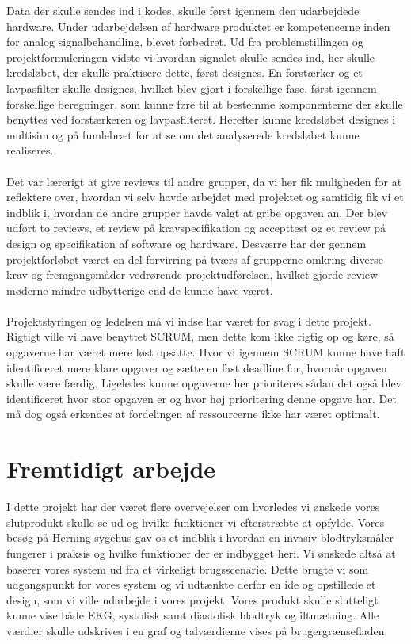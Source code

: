 Data der skulle sendes ind i kodes, skulle først igennem den udarbejdede hardware. Under udarbejdelsen af hardware produktet er kompetencerne inden for analog signalbehandling, blevet forbedret. Ud fra problemstillingen og projektformuleringen vidste vi hvordan signalet skulle sendes ind, her skulle kredsløbet, der skulle praktisere dette, først designes. En forstærker og et lavpasfilter skulle designes, hvilket blev gjort i forskellige fase, først igennem forskellige beregninger, som kunne føre til at bestemme komponenterne der skulle benyttes ved forstærkeren og lavpasfilteret. Herefter kunne kredsløbet designes i multisim og på fumlebræt for at se om det analyserede kredsløbet kunne realiseres. \\\\
Det var lærerigt at give reviews til andre grupper, da vi her fik muligheden for at reflektere over, hvordan vi selv havde arbejdet med projektet og samtidig fik vi et indblik i, hvordan de andre grupper havde valgt at gribe opgaven an. Der blev udført to reviews, et review på kravspecifikation og accepttest og et review på design og specifikation af software og hardware.  Desværre har der gennem projektforløbet været en del forvirring på tværs af grupperne omkring diverse krav og fremgangsmåder vedrørende projektudførelsen, hvilket gjorde review møderne mindre udbytterige end de kunne have været.\\\\
Projektstyringen og ledelsen må vi indse har været for svag i dette projekt. Rigtigt ville vi have benyttet SCRUM, men dette kom ikke rigtig op og køre, så opgaverne har været mere løst opsatte. Hvor vi igennem SCRUM kunne have haft identificeret mere klare opgaver og sætte en fast deadline for, hvornår opgaven skulle være færdig. Ligeledes kunne opgaverne her prioriteres sådan det også blev identificeret hvor stor opgaven er og hvor høj prioritering denne opgave har. Det må dog også erkendes at fordelingen af ressourcerne ikke har været optimalt. 
\section{Fremtidigt arbejde}
I dette projekt har der været flere overvejelser om hvorledes vi ønskede vores slutprodukt skulle se ud og hvilke funktioner vi efterstræbte at opfylde. Vores besøg på Herning sygehus gav os et indblik i hvordan en invasiv blodtryksmåler fungerer i praksis og hvilke funktioner der er indbygget heri. Vi ønskede altså at baserer vores system ud fra et virkeligt brugsscenarie. Dette brugte vi som udgangspunkt for vores system og vi udtænkte derfor en ide og opstillede et design, som vi ville udarbejde i vores projekt. Vores produkt skulle slutteligt kunne vise både EKG, systolisk samt diastolisk blodtryk og iltmætning. Alle værdier skulle udskrives i en graf og talværdierne vises på brugergrænsefladen. 
